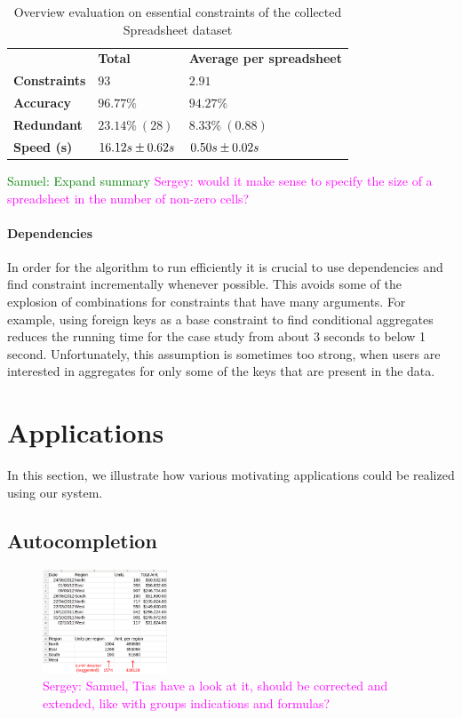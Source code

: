 \documentclass{IEEEtran}
\newcommand{\sergey}[1]{\textcolor{magenta}{{\sc Sergey:} #1}\xspace}
\newcommand{\samuel}[1]{\textcolor{green}{{\sc Samuel:} #1}\xspace}
\theoremstyle{definition}
\begin{document}
\begin{table}
  \centering
  \begin{tabular}{lll}
    & \textbf{Total} & \textbf{Average per spreadsheet} \\
    \textbf{Constraints} & $93$ & $2.91$ \\
    \textbf{Accuracy} & $96.77\%$ & $94.27\%$ \\
    \textbf{Redundant} & $23.14\%~(28)$ & $8.33\%~(0.88)$ \\
    \textbf{Speed (s)} & ${16.12}s \pm {0.62}s$ & ${0.50}s \pm {0.02}s$
  \end{tabular}
  \caption{Overview evaluation on essential constraints of the collected Spreadsheet dataset}
\end{table}
\samuel{Expand summary}
\sergey{would it make sense to specify the size of a spreadsheet in the number of non-zero cells?}

\paragraph{Dependencies}
In order for the algorithm to run efficiently it is crucial to use dependencies and find constraint incrementally whenever possible.
This avoids some of the explosion of combinations for constraints that have many arguments.
For example, using foreign keys as a base constraint to find conditional aggregates reduces the running time for the case study from about 3 seconds to below 1 second.
Unfortunately, this assumption is sometimes too strong, when users are interested in aggregates for only some of the keys that are present in the data.

\section{Applications}\label{sec:applications}
In this section, we illustrate how various motivating applications could be realized using our system.

\subsection{Autocompletion}
\begin{figure}[thb]
  \begin{center}
    \includegraphics[width=0.33\textwidth]{figures/autocompletion_example.png}
  \end{center}
  \caption{\sergey{Samuel, Tias have a look at it, should be corrected and extended, like with groups indications and formulas?}}
  \label{fig:autocompletion_example}
\end{figure}
\end{document}
